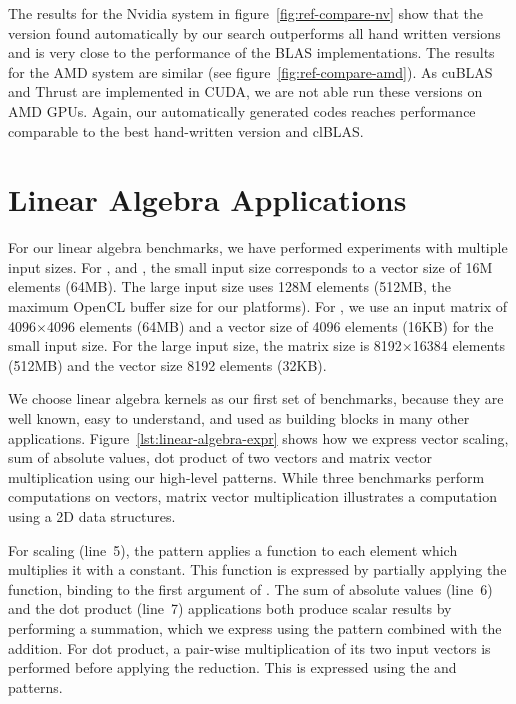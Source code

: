 The results for the Nvidia system in figure~\ref{fig:ref-compare-nv} show that the version found automatically by our search outperforms all hand written versions and is very close to the performance of the BLAS implementations.
The results for the AMD system are similar (see figure~\ref{fig:ref-compare-amd}).
As cuBLAS and Thrust are implemented in CUDA, we are not able run these versions on AMD GPUs.
Again, our automatically generated codes reaches performance comparable to the best hand-written version and clBLAS.













\section{Linear Algebra Applications}

For our linear algebra benchmarks, we have performed experiments with multiple input sizes.
For ,  and , the small input size corresponds to a vector size of 16M elements (64MB).
The large input size uses 128M elements (512MB, the maximum OpenCL buffer size for our platforms).
For , we use an input matrix of 4096$\times$4096 elements (64MB) and a vector size of 4096 elements (16KB) for the small input size.
For the large input size, the matrix size is 8192$\times$16384 elements (512MB) and the vector size 8192 elements (32KB).


We choose linear algebra kernels as our first set of benchmarks, because they are well known, easy to understand, and used as building blocks in many other applications.
Figure~\ref{lst:linear-algebra-expr} shows how we express vector scaling, sum of absolute values, dot product of two vectors and matrix vector multiplication using our high-level patterns.
While three benchmarks perform computations on vectors, matrix vector multiplication illustrates a computation using a 2D data structures.

For scaling (line~5), the  pattern applies a function to each element which multiplies it with a constant.
This function is expressed by partially applying the  function, \ie binding  to the first argument of .
The sum of absolute values (line~6) and the dot product (line~7) applications both produce scalar results by performing a summation, which we express using the  pattern combined with the addition.
For dot product, a pair-wise multiplication of its two input vectors is performed before applying the reduction.
This is expressed using the  and  patterns.

